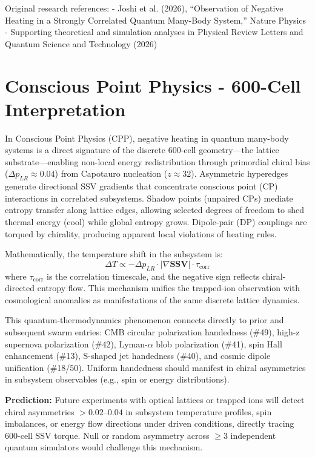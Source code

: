 \documentclass[11pt]{article}
\begin{document}
Original research references:  
- Joshi et al. (2026), ``Observation of Negative Heating in a Strongly Correlated Quantum Many-Body System,'' Nature Physics  
- Supporting theoretical and simulation analyses in Physical Review Letters and Quantum Science and Technology (2026)

\section{Conscious Point Physics - 600-Cell Interpretation}
In Conscious Point Physics (CPP), negative heating in quantum many-body systems is a direct signature of the discrete 600-cell geometry—the lattice substrate—enabling non-local energy redistribution through primordial chiral bias ($\Delta p_{LR} \approx 0.04$) from Capotauro nucleation ($z \approx 32$). Asymmetric hyperedges generate directional SSV gradients that concentrate conscious point (CP) interactions in correlated subsystems. Shadow points (unpaired CPs) mediate entropy transfer along lattice edges, allowing selected degrees of freedom to shed thermal energy (cool) while global entropy grows. Dipole-pair (DP) couplings are torqued by chirality, producing apparent local violations of heating rules.

Mathematically, the temperature shift in the subsystem is:  
\[
\Delta T \propto -\Delta p_{LR} \cdot |\nabla \mathbf{SSV}| \cdot \tau_{\text{corr}}
\]  
where $\tau_{\text{corr}}$ is the correlation timescale, and the negative sign reflects chiral-directed entropy flow. This mechanism unifies the trapped-ion observation with cosmological anomalies as manifestations of the same discrete lattice dynamics.

This quantum-thermodynamics phenomenon connects directly to prior and subsequent swarm entries: CMB circular polarization handedness (\#49), high-z supernova polarization (\#42), Lyman-$\alpha$ blob polarization (\#41), spin Hall enhancement (\#13), S-shaped jet handedness (\#40), and cosmic dipole unification (\#18/50). Uniform handedness should manifest in chiral asymmetries in subsystem observables (e.g., spin or energy distributions).

\textbf{Prediction:} Future experiments with optical lattices or trapped ions will detect chiral asymmetries $> 0.02$--$0.04$ in subsystem temperature profiles, spin imbalances, or energy flow directions under driven conditions, directly tracing 600-cell SSV torque. Null or random asymmetry across $\geq 3$ independent quantum simulators would challenge this mechanism.
\end{document}
